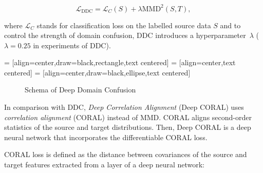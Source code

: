 \begin{equation}
	\mathcal{L}_{\mathrm{DDC}} = \mathcal{L}_C(S)
	+ \lambda \mathrm{MMD}^2(S, T),
	\label{ddc_loss}
\end{equation}

where \(\mathcal{L}_C\) stands for classification loss on the labelled source data \(S\) and to control the strength of domain confusion,
DDC introduces a hyperparameter~\(\lambda\)
(\(\lambda = 0.25\) in experiments of DDC).

 = [align=center,draw=black,rectangle,text centered]
 = [align=center,text centered]
 = [align=center,draw=black,ellipse,text centered]
\begin{figure}
\begin{center}
\end{center}
\caption{Schema of Deep Domain Confusion}
\end{figure}

In comparison with DDC, \textit{Deep Correlation Alignment} (Deep CORAL) uses \textit{correlation alignment} (CORAL) instead of MMD.
CORAL aligns second-order statistics of the source and target distributions.
Then, Deep CORAL is a deep neural network
that incorporates the differentiable CORAL loss.

CORAL loss is defined as the distance between covariances of the source and target features extracted from a layer of a deep neural network:

